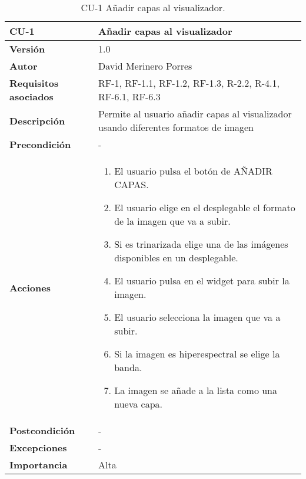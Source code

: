 \begin{table}[p]
	\centering
	\begin{tabularx}{\linewidth}{ p{} p{} }
		\toprule
		\textbf{CU-1}    & \textbf{Añadir capas al visualizador}\\
		\toprule
		\textbf{Versión}              & 1.0    \\
		\textbf{Autor}                & David Merinero Porres \\
		\textbf{Requisitos asociados} & RF-1, RF-1.1, RF-1.2, RF-1.3, R-2.2, R-4.1, RF-6.1, RF-6.3 \\
		\textbf{Descripción}          & Permite al usuario añadir capas al visualizador usando diferentes formatos de imagen \\
		\textbf{Precondición}         & - \\
		\textbf{Acciones}             &
		\begin{enumerate}
			\def\labelenumi{\arabic{enumi}.}
			\tightlist
			\item El usuario pulsa el botón de AÑADIR CAPAS.
			\item El usuario elige en el desplegable el formato de la imagen que va a subir.
   			\item Si es trinarizada elige una de las imágenes disponibles en un desplegable.
   			\item El usuario pulsa en el widget para subir la imagen.
			\item El usuario selecciona la imagen que va a subir.
			\item Si la imagen es hiperespectral se elige la banda.
   			\item La imagen se añade a la lista como una nueva capa.
		\end{enumerate}\\
		\textbf{Postcondición}        & - \\
		\textbf{Excepciones}          & - \\
		\textbf{Importancia}          & Alta \\
		\bottomrule
	\end{tabularx}
	\caption{CU-1 Añadir capas al visualizador.}
\end{table}

